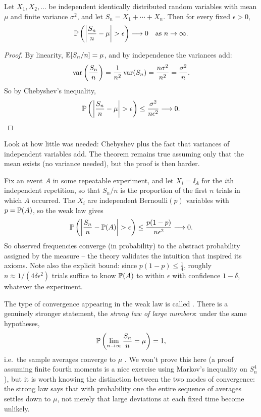 \documentclass[a4paper]{scrartcl}
\begin{document}
\begin{theorem}
	Let $X_1, X_2, \dots$ be independent identically distributed random variables with mean $\mu$ and finite variance $\sigma^2$, and let $S_n = X_1 + \cdots + X_n$. Then for every fixed $\epsilon > 0$,
	$$
	\mathbb{P}\left(\left|\frac{S_n}{n} - \mu\right| > \epsilon \right) \longrightarrow 0 \quad \text{as } n \rightarrow \infty.
	$$
\end{theorem}
\begin{proof}
	By linearity, $\mathbb{E}[S_n / n] = \mu$, and by independence the variances add:
	$$
	\operatorname{var}\left(\frac{S_n}{n}\right) = \frac{1}{n^2}\operatorname{var}(S_n) = \frac{n\sigma^2}{n^2} = \frac{\sigma^2}{n}.
	$$
	So by Chebyshev's inequality,
	$$
	\mathbb{P}\left(\left|\frac{S_n}{n} - \mu\right| > \epsilon\right) \leq \frac{\sigma^2}{n\epsilon^2} \longrightarrow 0. \qedhere
	$$
\end{proof}

Look at how little was needed: Chebyshev plus the fact that variances of independent variables add. The theorem remains true assuming only that the mean exists (no variance needed), but the proof is then harder.

\begin{example}
	Fix an event $A$ in some repeatable experiment, and let $X_i = \ii_{A}$ for the $i$th independent repetition, so that $S_n / n$ is the proportion of the first $n$ trials in which $A$ occurred. The $X_i$ are independent $\mathrm{Bernoulli}(p)$ variables with $p = \mathbb{P}(A)$, so the weak law gives
	$$
	\mathbb{P}\left(\left|\frac{S_n}{n} - \mathbb{P}(A)\right| > \epsilon\right) \leq \frac{p(1-p)}{n\epsilon^2} \longrightarrow 0.
	$$
	So observed frequencies converge (in probability) to the abstract probability assigned by the measure -- the theory validates the intuition that inspired its axioms. Note also the explicit bound: since $p(1-p) \leq \frac14$, roughly $n \approx 1/(4\delta\epsilon^2)$ trials suffice to know $\mathbb{P}(A)$ to within $\epsilon$ with confidence $1 - \delta$, whatever the experiment.
\end{example}

\begin{remark}
	The type of convergence appearing in the weak law is called . There is a genuinely stronger statement, the \emph{strong law of large numbers}: under the same hypotheses,
	$$
	\mathbb{P}\left(\lim_{n \to \infty} \frac{S_n}{n} = \mu\right) = 1,
	$$
	i.e.\ the sample averages converge to $\mu$ . We won't prove this here (a proof assuming finite fourth moments is a nice exercise using Markov's inequality on $S_n^4$), but it is worth knowing the distinction between the two modes of convergence: the strong law says that with probability one the entire sequence of averages settles down to $\mu$, not merely that large deviations at each fixed time become unlikely.
\end{remark}
\end{document}
